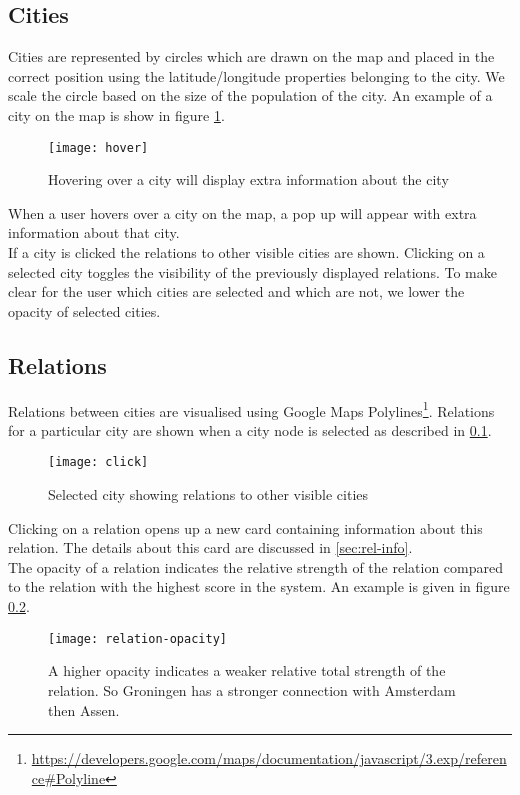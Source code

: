 \subsection{Cities}\label{sec:city}
Cities are represented by circles which are drawn on the map and placed in the correct position using the latitude/longitude properties belonging to the city. We scale the circle based on the size of the population of the city. An example of a city on the map is show in figure \ref{fig:map-city}.

\begin{figure}[H]
  \centering
  \texttt{[image: hover]}
  \caption{Hovering over a city will display extra information about the city}
  \label{fig:map-city}
\end{figure}

When a user hovers over a city on the map, a pop up will appear with extra information about that city.\\
If a city is clicked the relations to other visible cities are shown. Clicking on a selected city toggles the visibility of the previously displayed relations. To make clear for the user  which cities are selected and which are not, we lower the opacity of selected cities.

\subsection{Relations}

Relations between cities are visualised using Google Maps Polylines\footnote{\url{https://developers.google.com/maps/documentation/javascript/3.exp/reference#Polyline}}. Relations for a particular city are shown when a city node is selected as described in \ref{sec:city}.\\
\begin{figure}[H]
  \centering
  \texttt{[image: click]}
  \caption{Selected city showing relations to other visible cities}
  \label{fig:sub2}
\end{figure}

Clicking on a relation opens up a new card containing information about this relation. The details about this card are discussed in \ref{sec:rel-info}.\\
The opacity of a relation indicates the relative strength of the relation compared to the relation with the highest score in the system. An example is given in figure \ref{}.

\begin{figure}[H]
  \centering
  \texttt{[image: relation-opacity]}
  \caption{A higher opacity indicates a weaker relative total strength of the relation. So Groningen has a stronger connection with Amsterdam then Assen.}
  \label{fig:relation-opacity}
\end{figure}


